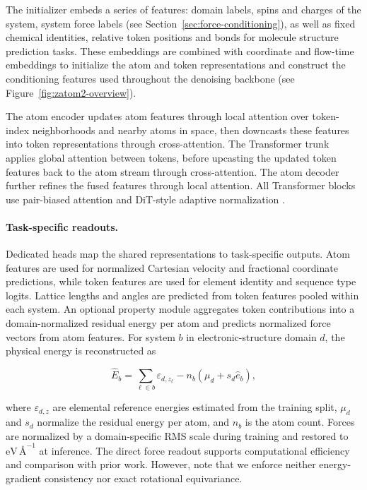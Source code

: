 \documentclass{article} %
\begin{document}
The initializer embeds a series of features: domain labels, spins and charges of the system, system force labels (see Section~\ref{sec:force-conditioning}), as well as fixed chemical identities, relative token positions and bonds for molecule structure prediction tasks. These embeddings are combined with coordinate and flow-time embeddings to initialize the atom and token representations and construct the conditioning features used throughout the denoising backbone (see Figure~\ref{fig:zatom2-overview}). 

The atom encoder updates atom features through local attention over token-index neighborhoods and nearby atoms in space, then downcasts these features into token representations through cross-attention. The Transformer trunk applies global attention between tokens, before upcasting the updated token features back to the atom stream through cross-attention. The atom decoder further refines the fused features
through local attention. All Transformer blocks use pair-biased
attention \citep{jumper2021highly} and DiT-style adaptive normalization
\citep{peebles2023scalable}.

\paragraph{Task-specific readouts.}
Dedicated heads map the shared representations to task-specific outputs.
Atom features are used for normalized Cartesian velocity and fractional coordinate
predictions, while token features are used for element identity and sequence type logits. Lattice lengths and angles are predicted from
token features pooled within each system. An optional property module
aggregates token contributions into a domain-normalized residual energy
per atom and predicts normalized force vectors from atom features.
For system $b$ in electronic-structure domain $d$, the physical energy is
reconstructed as

\begin{equation}
\widehat{E}_b =
\sum_{\ell \in b}\varepsilon_{d,z_\ell}
- n_b\left(\mu_d+s_d\widehat{e}_b\right),
\label{eq:energy-reconstruction}
\end{equation}

where $\varepsilon_{d,z}$ are elemental reference energies estimated
from the training split, $\mu_d$ and $s_d$ normalize the residual energy
per atom, and $n_b$ is the atom count. Forces are normalized by a
domain-specific RMS scale during training and restored to
$\mathrm{eV}\,\text{\AA}^{-1}$ at inference. The direct force readout
supports computational efficiency and comparison with prior work. However, note that we enforce neither energy-gradient consistency nor exact rotational equivariance.
\end{document}
